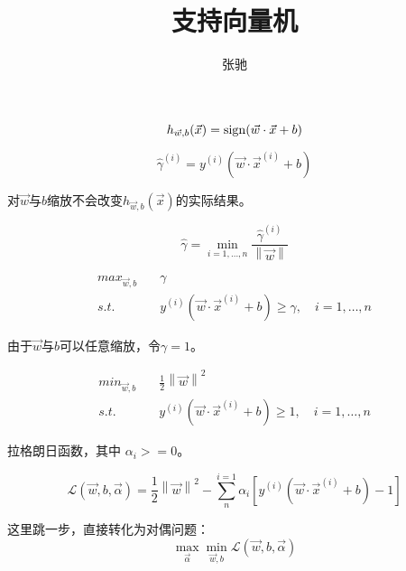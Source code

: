 \documentclass[letterpaper,11pt]{article}
\numberwithin{equation}{section}
\begin{document}
\title{支持向量机}
\author{张驰}
\maketitle

\begin{equation}
    h_{{\vec{w}},b}(\vec{x})={\rm sign}(\vec{w} \cdot \vec{x}+b)
\end{equation}

\begin{equation}
    \hat{\gamma}^{(i)}=y^{(i)}(\vec{w} \cdot \vec{x}^{(i)}+b)
\end{equation}

对$\vec{w}$与$b$缩放不会改变$h_{{\vec{w}},b}(\vec{x})$的实际结果。

\begin{equation}
    \hat{\gamma} = \mathop{min} \limits_{i=1,\dots,n} \frac{\hat{\gamma}^{(i)}}{\left \| \vec{w} \right \|}
\end{equation}

\begin{equation}
    \begin{aligned}
        max_{\vec{w},b} \quad & \gamma                                                                 \\
        s.t. \quad            & y^{(i)}(\vec{w} \cdot \vec{x}^{(i)} + b) \ge \gamma, \quad i=1,\dots,n
    \end{aligned}
\end{equation}

由于$\vec{w}$与$b$可以任意缩放，令$\gamma=1$。

\begin{equation}
    \begin{aligned}
        min_{\vec{w},b} \quad & \frac{1}{2} {\left \| \vec{w} \right \|}^2                        \\
        s.t. \quad            & y^{(i)}(\vec{w} \cdot \vec{x}^{(i)} + b) \ge 1, \quad i=1,\dots,n
    \end{aligned}
\end{equation}

拉格朗日函数，其中 $\alpha_i>=0$。

\begin{equation}
    \mathcal{L}(\vec{w},b,\vec{\alpha})=\frac{1}{2} {\left \| \vec{w} \right \|}^2-\sum_{n}^{i=1}\alpha_i \left[ y^{(i)}(\vec{w} \cdot \vec{x}^{(i)} + b)-1 \right]
    \label{eq:lagrange}
\end{equation}

这里跳一步，直接转化为对偶问题：
\begin{equation}
    \mathop{max}_{\vec{\alpha}}\mathop{min}_{\vec{w},b}\mathcal{L}(\vec{w},b,\vec{\alpha})
\end{equation}
\end{document}
